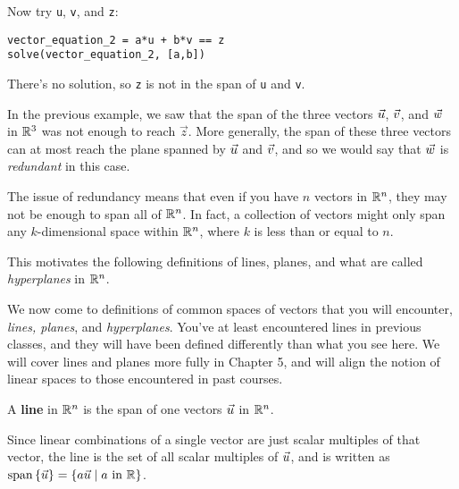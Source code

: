 \documentclass{ximera}
\begin{document}
\begin{exploration}
\begin{example}
\begin{solution}
Now try \verb|u|, \verb|v|, and \verb|z|:
\begin{verbatim}
vector_equation_2 = a*u + b*v == z
solve(vector_equation_2, [a,b])
\end{verbatim}

There's no solution, so \verb|z| is not in the span of \verb|u| and \verb|v|.


  \end{solution}
  
\end{example}

\end{exploration}

\begin{exploration}

  In the previous example, we saw that the span of the three vectors $\vec{u}$, $\vec{v}$, and $\vec{w}$ in $\mathbb{R}^3$ was not enough to reach $\vec{z}$. More generally, the span of these three vectors can at most reach the plane spanned by $\vec{u}$ and $\vec{v}$, and so we would say that $\vec{w}$ is \emph{redundant} in this case.

  The issue of redundancy means that even if you have $n$ vectors in $\mathbb{R}^n$, they may not be enough to span all of $\mathbb{R}^n$. In fact, a collection of vectors might only span any $k$-dimensional space within $\mathbb{R}^n$, where $k$ is less than or equal to $n$.

  This motivates the following definitions of lines, planes, and what are called \emph{hyperplanes} in $\mathbb{R}^n$.

  \begin{remark}

    We now come to definitions of common spaces of vectors that you will encounter, \emph{lines, planes}, and \emph{hyperplanes}. You've at least encountered lines in previous classes, and they will have been defined differently than what you see here. We will cover lines and planes more fully in Chapter 5, and will align the notion of linear spaces to those encountered in past courses.

  \end{remark}

  \begin{definition}

    A \textbf{line} in $\mathbb{R}^n$ is the span of one vectors $\vec{u}$ in $\mathbb{R}^n$. 
    
    Since linear combinations of a single vector are just scalar multiples of that vector, the line is the set of all scalar multiples of $\vec{u}$, and is written as $\text{span}\left\{\vec{u}\right\}=\left\{a\vec{u}\mid a\text{ in }\mathbb{R}\right\}$.


\end{definition}
\end{exploration}
\end{document}
